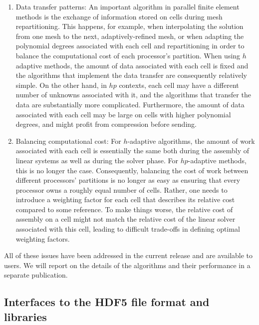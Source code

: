 \documentclass{ansarticle-preprint}
\begin{document}
\begin{enumerate}
\item Data transfer patterns: An important algorithm in parallel
  finite element methods is the exchange of information stored on
  cells during mesh repartitioning. This happens, for example, when
  interpolating the solution from one mesh to the next,
  adaptively-refined mesh, or when adapting the polynomial degrees
  associated with each cell and repartitioning in order to
  balance the computational cost of each processor's partition. When
  using $h$ adaptive methods, the amount of data associated with each
  cell is fixed and the algorithms that implement the data transfer
  are consequently relatively simple. On the other hand, in $hp$
  contexts, each cell may have a different number of unknowns
  associated with it, and the algorithms that transfer the data are
  substantially more complicated. Furthermore, the amount of data
  associated with each cell may be large on cells with higher
  polynomial degrees, and might profit from compression before
  sending.

\item Balancing computational cost: For $h$-adaptive algorithms, the
  amount of work associated with each cell is essentially the same
  both during the assembly of linear systems as well as during the
  solver phase. For $hp$-adaptive methods, this is no longer the
  case. Consequently, balancing the cost of work between different
  processors' partitions is no longer as easy as ensuring that every
  processor owns a roughly equal number of cells. Rather, one needs to
  introduce a weighting factor for each cell that describes its
  relative cost compared to some reference. To make things worse, the
  relative cost of assembly on a cell might not match the relative
  cost of the linear solver associated with this cell, leading to
  difficult trade-offs in defining optimal weighting factors.
\end{enumerate}

All of these issues have been addressed in the current release and are
available to users. We will report on the details of the algorithms
and their performance in a separate publication.


\subsection{Interfaces to the HDF5 file format and libraries}
\label{subsec:hdf5}
\end{document}
